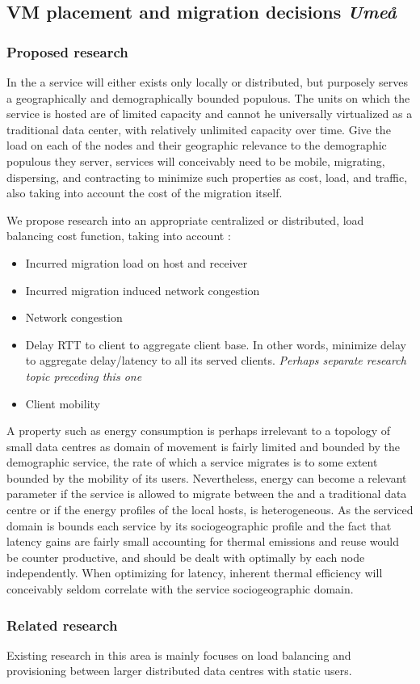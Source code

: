 \subsection{VM placement and migration decisions \emph{Umeå}}
\subsubsection{Proposed research}
In the \xcloud a service will either exists only locally or distributed, but purposely serves a geographically and demographically bounded populous. The units on which the service is hosted are of limited capacity and cannot he universally virtualized as a traditional data center, with relatively unlimited capacity over time. Give the load on each of the nodes and their geographic relevance to the demographic populous they server, services will conceivably need to be mobile, migrating, dispersing, and contracting to minimize such properties as cost, load, and traffic, also taking into account the cost of the migration itself.

We propose research into an appropriate centralized or distributed, load balancing cost function, taking into account :

\begin{itemize}
\item Incurred migration load on host and receiver
\item Incurred migration induced network congestion
\item Network congestion
\item Delay \/ RTT to client to aggregate client base. In other words, minimize delay to aggregate delay/latency to all its served clients. \emph{Perhaps separate research topic preceding this one}
\item Client mobility
\end{itemize}

A property such as energy consumption is perhaps irrelevant to a topology of small data centres as domain of movement is fairly limited and bounded by the demographic service, the rate of which a service migrates is to some extent bounded by the mobility of its users. Nevertheless, energy can become a relevant parameter if the service is allowed to migrate between the \xcloud and a traditional data centre or if the energy profiles of the local \xcloud hosts, is heterogeneous. As the serviced domain is bounds each service by its sociogeographic profile and the fact that latency gains are fairly small accounting for thermal emissions and reuse would be counter productive, and should be dealt with optimally by each node independently. When optimizing for latency, inherent thermal efficiency will conceivably seldom correlate with the service sociogeographic domain. 

\subsubsection{Related research}
Existing research in this area is mainly focuses on load balancing and provisioning between larger distributed data centres with static users.